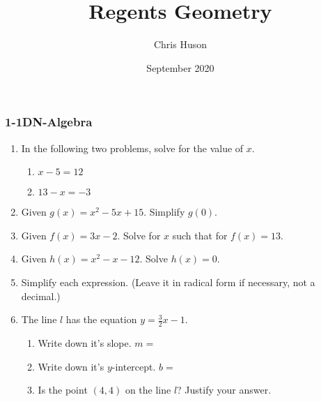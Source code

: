 \documentclass[12pt, twoside]{article}
\title{Regents Geometry}
\author{Chris Huson}
\date{September 2020}
\begin{document}
\subsubsection*{1-1DN-Algebra}
\begin{enumerate}
\item In the following two problems, solve for the value of $x$.
  \begin{multicols}{2}
    \begin{enumerate}
      \item   $x-5=12$ \vspace{6cm}
      \item   $13-x=-3$ \vspace{6cm}
    \end{enumerate}
  \end{multicols}
    \vspace{3cm}

\item Given $g(x)=x^2-5x+15$. Simplify $g(0)$. \vspace{3cm}
\item Given $f(x)=3x-2$. Solve for $x$ such that for $f(x)=13$. \vspace{4cm}
\item Given $h(x)=x^2-x-12$. Solve $h(x)=0$. \vspace{5cm}
  

\item Simplify each expression. (Leave it in radical form if necessary, not a decimal.)
    \begin{enumerate}
    \end{enumerate}
    \vspace{0.5cm}

\newpage

\item The line $l$ has the equation $y=\frac{3}{2}x-1$. 
\begin{enumerate}
  \item Write down it's slope. $m=$
  \vspace{0.5cm}
  \item Write down it's $y$-intercept. $b=$
  \vspace{0.5cm}
  \item Is the point $(4, 4)$ on the line $l$? Justify your answer.
\end{enumerate}
\vspace{2.5cm}


\end{enumerate}
\end{document}
